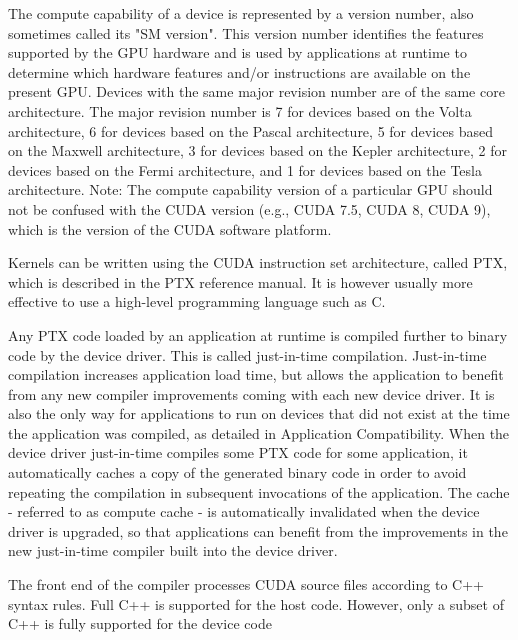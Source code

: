 \documentclass[openany]{book}
\begin{document}
The compute capability of a device is represented by a version number, also 
sometimes called its "SM version". This version number identifies the features 
supported by the GPU hardware and is used by applications at runtime to 
determine which hardware features and/or instructions are available on the 
present GPU. Devices with the same major revision number are of the same core 
architecture. The major revision number is 7 for devices based on the Volta 
architecture, 6 for devices based on the Pascal architecture, 5 for devices 
based on the Maxwell architecture, 3 for devices based on the Kepler 
architecture, 2 for devices based on the Fermi architecture, and 1 for devices 
based on the Tesla architecture. Note: The compute capability version of a 
particular GPU should not be confused with the CUDA version (e.g., CUDA 7.5, 
CUDA 8, CUDA 9), which is the version of the CUDA software 
platform.~\cite[p.~2.4]{CUDA18}

Kernels can be written using the CUDA instruction set architecture, called PTX, 
which is described in the PTX reference manual. It is however usually more 
effective to use a high-level programming language such as 
C.~\cite[p.~3.1]{CUDA18}

Any PTX code loaded by an application at runtime is compiled further to binary 
code by the device driver. This is called just-in-time compilation. 
Just-in-time compilation increases application load time, but allows the 
application to benefit from any new compiler improvements coming with each new 
device driver. It is also the only way for applications to run on devices that 
did not exist at the time the application was compiled, as detailed in 
Application Compatibility. When the device driver just-in-time compiles some 
PTX code for some application, it automatically caches a copy of the generated 
binary code in order to avoid repeating the compilation in subsequent 
invocations of the application. The cache - referred to as compute cache - is 
automatically invalidated when the device driver is upgraded, so that 
applications can benefit from the improvements in the new just-in-time compiler 
built into the device driver.~\cite[p.~3.1.1.2]{CUDA18}

The front end of the compiler processes CUDA source files according to C++ 
syntax rules. Full C++ is supported for the host code. However, only a subset 
of C++ is fully supported for the device code~\cite[p.~3.1.5]{CUDA18}
\end{document}
